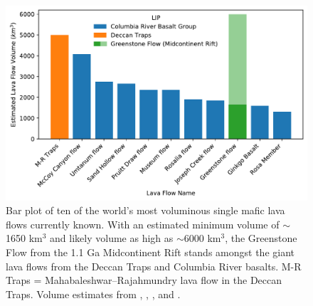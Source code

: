 \begin{figure}[h!]
\noindent\includegraphics[width=\textwidth]{figure/Zhang2021/Lava_flow_rank.pdf}
\caption[Bar plot of ten of the world's most voluminous single mafic lava flows currently known.]{\footnotesize{Bar plot of ten of the world's most voluminous single mafic lava flows currently known. With an estimated minimum volume of $\sim$1650 km$^3$ and likely volume as high as $\sim$6000 km$^3$, the Greenstone Flow from the 1.1 Ga Midcontinent Rift stands amongst the giant lava flows from the Deccan Traps and Columbia River basalts. M-R Traps = Mahabaleshwar--Rajahmundry lava flow in the Deccan Traps. Volume estimates from \cite{Self2008a}, \cite{Bryan2010a}, \cite{Longo1984a}, and \cite{Doyle2016a}.}}
\label{fig:lava_flow_rank}
\end{figure}

